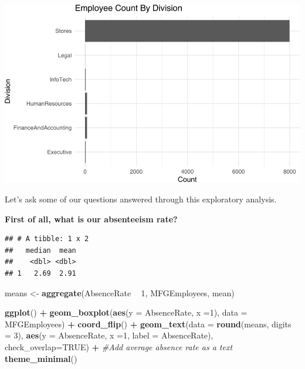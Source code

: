 \documentclass[12pt, krantz2,]{krantz}
\makeatletter
\newenvironment{Shaded}{\begin{snugshade}}{\end{snugshade}}
\newcommand{\CommentTok}[1]{\textcolor[rgb]{0.37,0.37,0.37}{\textit{#1}}}
\newcommand{\DataTypeTok}[1]{\textcolor[rgb]{0.27,0.27,0.27}{#1}}
\newcommand{\DecValTok}[1]{\textcolor[rgb]{0.06,0.06,0.06}{#1}}
\newcommand{\KeywordTok}[1]{\textcolor[rgb]{0.27,0.27,0.27}{\textbf{#1}}}
\newcommand{\NormalTok}[1]{#1}
\newcommand{\OperatorTok}[1]{\textcolor[rgb]{0.43,0.43,0.43}{\textbf{#1}}}
\newcommand{\OtherTok}[1]{\textcolor[rgb]{0.37,0.37,0.37}{#1}}
\newcommand{\StringTok}[1]{\textcolor[rgb]{0.5,0.5,0.5}{#1}}
\newenvironment{kframe}{%
\medskip{}
\setlength{\fboxsep}{.8em}
 \def\at@end@of@kframe{}%
 \ifinner\ifhmode%
  \def\at@end@of@kframe{\end{minipage}}%
  \begin{minipage}{\columnwidth}%
 \fi\fi%
 \def\FrameCommand##1{\hskip\@totalleftmargin \hskip-\fboxsep
 \colorbox{shadecolor}{##1}\hskip-\fboxsep
     \hskip-\linewidth \hskip-\@totalleftmargin \hskip\columnwidth}%
 \MakeFramed {\advance\hsize-\width
   \@totalleftmargin\z@ \linewidth\hsize
   \@setminipage}}%
 {\par\unskip\endMakeFramed%
 \at@end@of@kframe}
\renewenvironment{Shaded}{\begin{kframe}}{\end{kframe}}
\makeatother
\begin{document}
\includegraphics[width=\textwidth]{hendrikfeddersen_files/figure-latex/unnamed-chunk-7-3}

Let's ask some of our questions answered through this exploratory analysis.

\textbf{First of all, what is our absenteeism rate?}

\begin{Shaded}
\end{Shaded}

\begin{verbatim}
## # A tibble: 1 x 2
##   median  mean
##    <dbl> <dbl>
## 1   2.69  2.91
\end{verbatim}

\begin{Shaded}
\begin{Highlighting}[]
\NormalTok{means <-}\StringTok{ }\KeywordTok{aggregate}\NormalTok{(AbsenceRate }\OperatorTok{~}\StringTok{ }\DecValTok{1}\NormalTok{, MFGEmployees, mean)}

\KeywordTok{ggplot}\NormalTok{() }\OperatorTok{+}\StringTok{ }
\StringTok{  }\KeywordTok{geom_boxplot}\NormalTok{(}\KeywordTok{aes}\NormalTok{(}\DataTypeTok{y =}\NormalTok{ AbsenceRate, }\DataTypeTok{x =}\DecValTok{1}\NormalTok{), }\DataTypeTok{data =}\NormalTok{ MFGEmployees) }\OperatorTok{+}
\StringTok{  }\KeywordTok{coord_flip}\NormalTok{() }\OperatorTok{+}
\StringTok{  }\KeywordTok{geom_text}\NormalTok{(}\DataTypeTok{data =} \KeywordTok{round}\NormalTok{(means, }\DataTypeTok{digits =} \DecValTok{3}\NormalTok{), }\KeywordTok{aes}\NormalTok{(}\DataTypeTok{y =}\NormalTok{ AbsenceRate, }\DataTypeTok{x =}\DecValTok{1}\NormalTok{, }\DataTypeTok{label =}\NormalTok{ AbsenceRate),  }\DataTypeTok{check_overlap=}\OtherTok{TRUE}\NormalTok{) }\OperatorTok{+}\StringTok{ }\CommentTok{#Add average absence rate as a text}
\StringTok{  }\KeywordTok{theme_minimal}\NormalTok{()}
\end{Highlighting}
\end{Shaded}
\end{document}
